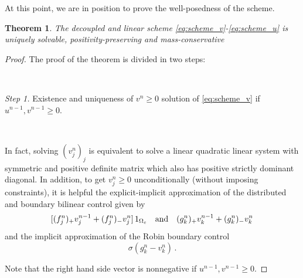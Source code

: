 \documentclass[11pt]{article}
\newtheorem{theorem}{Theorem}[]
\numberwithin{theorem}{section}
\begin{document}
At this point, we are in position to prove the well-posedness of the scheme. 
\begin{theorem}\label{th:well-posed-scheme}
The decoupled and linear scheme \eqref{eq:scheme_v}-\eqref{eq:scheme_u} is uniquely solvable, positivity-preserving and mass-conservative
\end{theorem}
\begin{proof} 
 The proof of the theorem is divided in two steps:

\

{\it Step 1.} Existence and uniqueness of  $v^n\ge 0$ solution of \eqref{eq:scheme_v}  if $u^{n-1},v^{n-1}\ge 0$. 

\

In fact, solving $(v^n_j)_j$ is equivalent to solve a linear quadratic linear system with symmetric and positive definite matrix which also has positive strictly dominant  diagonal. In addition,  to get $v^n_j\ge 0$ unconditionally (without imposing constraints),  it is  helpful the explicit-implicit approximation of the distributed and boundary bilinear control given by 
$$
[(f^n_j)_+v^{n-1}_j+(f_j^n)_-v^n_j ]\, 1_{\Omega_c}
\quad \hbox{and} \quad
 (g^n_k)_+ v^{n-1}_k + (g^n_k)_- v^{n}_k
$$
and the  implicit approximation of the Robin  boundary control
$$
\sigma(g^n_k-v^n_k)\,.
$$

Note that the right hand side vector is nonnegative if $u^{n-1},v^{n-1}\ge 0$.

%
%


\end{proof}
\end{document}
